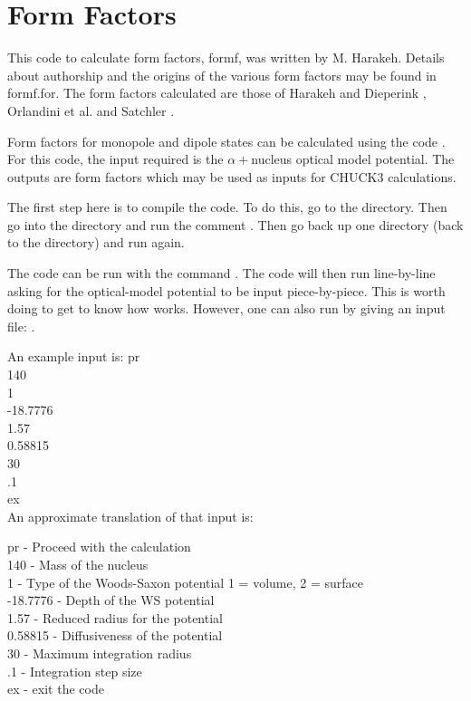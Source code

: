 \documentclass[a4paper,10pt]{article}
\begin{document}
\section{Form Factors}

This code to calculate form factors, formf, was written by M. Harakeh. Details about authorship and the origins of the various form factors may be found in formf.for. The form factors calculated are those of Harakeh and Dieperink \cite{dummy}, Orlandini et al. \cite{dummy} and Satchler \cite{dummy}.

Form factors for monopole and dipole states can be calculated using the code . For this code, the input required is the $\alpha+$nucleus optical model potential. The outputs are form factors which may be used as inputs for CHUCK3 calculations.

The first step here is to compile the code. To do this, go to the  directory. Then go into the  directory and run the comment . Then go back up one directory (back to the  directory) and run  again.

The code can be run with the command . The code will then run line-by-line asking for the optical-model potential to be input piece-by-piece. This is worth doing to get to know how  works. However, one can also run  by giving an input file: .

An example input is:
\newline
\noindent pr\\
140\\
1\\
-18.7776\\
1.57\\
0.58815\\
30\\
.1\\
ex\\

An approximate translation of that input is:
\newline

\noindent pr - Proceed with the calculation\\
140 - Mass of the nucleus\\
1 - Type of the Woods-Saxon potential 1 = volume, 2 = surface\\
-18.7776 - Depth of the WS potential\\
1.57 - Reduced radius for the potential\\
0.58815 - Diffusiveness of the potential\\
30 - Maximum integration radius\\
.1 - Integration step size\\
ex - exit the code\\
\end{document}
